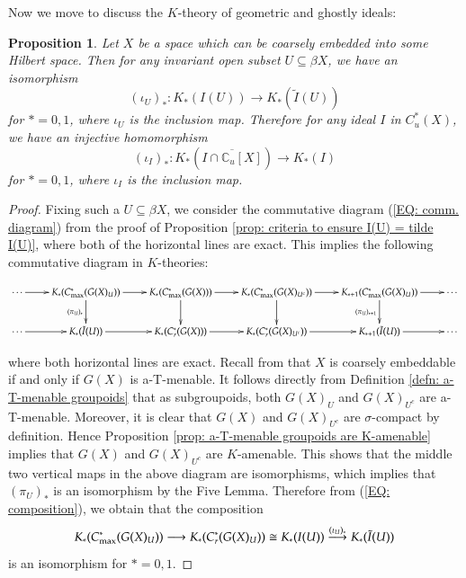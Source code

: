 \documentclass[12pt, a4paper]{amsart}
\numberwithin{equation}{section}
\newtheorem{prop}[thm]{Proposition}
\theoremstyle{definition}
\theoremstyle{remark}
\def\CC{\mathbb{C}}
\begin{document}
Now we move to discuss the $K$-theory of geometric and ghostly ideals:

\begin{prop}\label{prop: criteria to ensure the same K-theory}
Let $X$ be a space which can be coarsely embedded into some Hilbert space. Then for any invariant open subset $U \subseteq \beta X$, we have an isomorphism
\[
(\iota_U)_\ast: K_\ast(I(U)) \longrightarrow K_\ast(\tilde{I}(U))
\]
for $\ast =0,1$, where $\iota_U$ is the inclusion map. Therefore for any ideal $I$ in $C^*_u(X)$, we have an injective homomorphism
\[
(\iota_I)_\ast: K_\ast(\overline{I \cap \CC_u[X]}) \longrightarrow K_\ast(I)
\]
for $\ast =0,1$, where $\iota_I$ is the inclusion map.
\end{prop}


\begin{proof}
Fixing such a $U\subseteq \beta X$, we consider the commutative diagram (\ref{EQ: comm. diagram}) from the proof of Proposition \ref{prop: criteria to ensure I(U) = tilde I(U)}, where both of the horizontal lines are exact. This implies the following commutative diagram in $K$-theories:
\begin{scriptsize}
\[
\xymatrix{
		\cdots \ar[r] & K_\ast(C^*_{{\rm max}}(G(X)_U)) \ar[r] \ar[d]_{(\pi_U)_\ast} & K_\ast(C^*_{{\rm max}}(G(X))) \ar[r] \ar[d] & K_\ast(C^*_{{\rm max}}(G(X)_{U^c})) \ar[r] \ar[d] & K_{\ast+1}(C^*_{{\rm max}}(G(X)_U)) \ar[r] \ar[d]_{(\pi_U)_{\ast +1}} &\cdots\\
		\cdots \ar[r] & K_\ast(\tilde{I}(U)) \ar[r] & K_\ast(C^*_r(G(X))) \ar[r] & K_\ast(C^*_r (G(X)_{U^c})) \ar[r] & K_{\ast+1}(\tilde{I}(U)) \ar[r] &\cdots
	}
\]
\end{scriptsize}
where both horizontal lines are exact. Recall from \cite[Theorem 5.4]{STY02} that $X$ is coarsely embeddable if and only if $G(X)$ is a-T-menable. It follows directly from Definition \ref{defn: a-T-menable groupoids} that as subgroupoids, both $G(X)_U$ and $G(X)_{U^c}$ are a-T-menable. Moreover, it is clear that $G(X)$ and $G(X)_{U^c}$ are $\sigma$-compact by definition. Hence Proposition \ref{prop: a-T-menable groupoids are K-amenable} implies that $G(X)$ and $G(X)_{U^c}$ are $K$-amenable. This shows that the middle two vertical maps in the above diagram are isomorphisms, which implies that $(\pi_U)_\ast$ is an isomorphism by the Five Lemma. Therefore from (\ref{EQ: composition}), we obtain that the composition
\[
K_\ast(C^*_{{\rm max}}(G(X)_U)) \longrightarrow K_\ast(C^*_r(G(X)_U)) \cong K_\ast(I(U)) \stackrel{(\iota_U)_\ast}{\longrightarrow} K_\ast(\tilde{I}(U))
\]
is an isomorphism for $\ast=0,1$. 


\end{proof}
\end{document}
